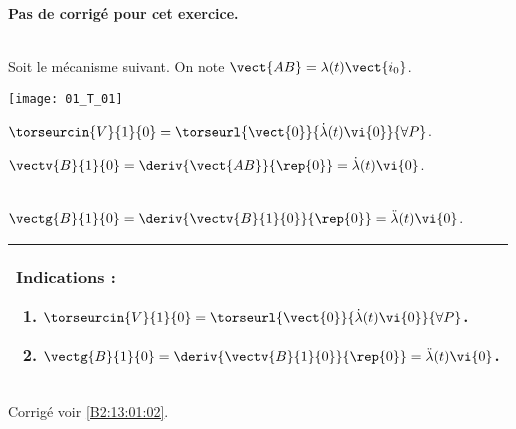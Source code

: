 \normaltrue
\correctiontrue


\setcounter{numques}{0}
\ifcorrection
\else
\textbf{Pas de corrigé pour cet exercice.}
\fi

\ifprof
\else ~\\
Soit le mécanisme suivant. On note $\vect{AB}=\lambda(t)\vect{i_0}$.
\begin{center}
\texttt{[image: 01\_T\_01]}
\end{center}
\fi

\ifprof
$\torseurcin{V}{1}{0} = \torseurl{\vect{0}}{\dot{\lambda}(t)\vi{0}}{\forall P}$.

$\vectv{B}{1}{0} = \deriv{\vect{AB}}{\rep{0}}=\dot{\lambda}(t)\vi{0}$.
\else
\fi

\ifprof  ~\\
 $\vectg{B}{1}{0} = \deriv{\vectv{B}{1}{0}}{\rep{0}}=\ddot{\lambda}(t)\vi{0}$.
\else
\fi


\ifprof
\else
\footnotesize
\begin{center}
\begin{tabular}{|p{.9\linewidth}|}
\hline
Indications :
\begin{enumerate}
\item $\torseurcin{V}{1}{0} = \torseurl{\vect{0}}{\dot{\lambda}(t)\vi{0}}{\forall P}$.
\item  $\vectg{B}{1}{0} = \deriv{\vectv{B}{1}{0}}{\rep{0}}=\ddot{\lambda}(t)\vi{0}$.
\end{enumerate} \\ \hline
\end{tabular}
\end{center}
\normalsize

\begin{flushright}
\footnotesize{Corrigé  voir \ref{B2:13:01:02}.}
\end{flushright}%
\fi



